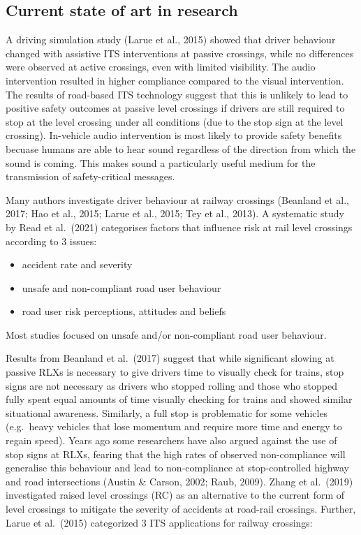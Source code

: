 \documentclass[
]{book}
\providecommand{\tightlist}{%
  \setlength{\itemsep}{0pt}\setlength{\parskip}{0pt}}
\begin{document}
\hypertarget{current-state-of-art-in-research-1}{%
\subsection*{Current state of art in research}\label{current-state-of-art-in-research-1}}

A driving simulation study (Larue et al., 2015) showed that driver behaviour changed with assistive ITS interventions at passive crossings, while no differences were observed at active crossings, even with limited visibility. The audio intervention resulted in higher compliance compared to the visual intervention. The results of road-based ITS technology suggest that this is unlikely to lead to positive safety outcomes at passive level crossings if drivers are still required to stop at the level crossing under all conditions (due to the stop sign at the level crossing). In-vehicle audio intervention is most likely to provide safety benefits becuase humans are able to hear sound regardless of the direction from which the sound is coming. This makes sound a particularly useful medium for the transmission of safety-critical messages.

Many authors investigate driver behaviour at railway crossings (Beanland et al., 2017; Hao et al., 2015; Larue et al., 2015; Tey et al., 2013). A systematic study by Read et al.~(2021) categorises factors that influence risk at rail level crossings according to 3 issues:

\begin{itemize}
\tightlist
\item
  accident rate and severity
\item
  unsafe and non-compliant road user behaviour
\item
  road user risk perceptions, attitudes and beliefs
\end{itemize}

Most studies focused on unsafe and/or non-compliant road user behaviour.

Results from Beanland et al.~(2017) suggest that while significant slowing at passive RLXs is necessary to give drivers time to visually check for trains, stop signs are not necessary as drivers who stopped rolling and those who stopped fully spent equal amounts of time visually checking for trains and showed similar situational awareness. Similarly, a full stop is problematic for some vehicles (e.g.~heavy vehicles that lose momentum and require more time and energy to regain speed). Years ago some researchers have also argued against the use of stop signs at RLXs, fearing that the high rates of observed non-compliance will generalise this behaviour and lead to non-compliance at stop-controlled highway and road intersections (Austin \& Carson, 2002; Raub, 2009). Zhang et al.~(2019) investigated raised level crossings (RC) as an alternative to the current form of level crossings to mitigate the severity of accidents at road-rail crossings. Further, Larue et al.~(2015) categorized 3 ITS applications for railway crossings:
\end{document}
